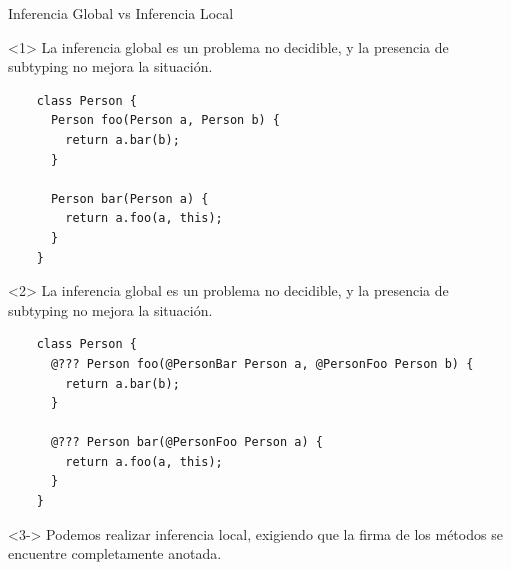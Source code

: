 \documentclass[aspectratio=169,10pt]{beamer}
\begin{document}
\begin{frame}[fragile]{Inferencia Global vs Inferencia Local}

  \begin{onlyenv}<1>
		\only<2-|handout:0>{\stepcounter{framenumber}}
    La inferencia global es un problema no decidible, y la presencia de subtyping no mejora la situación.
    \begin{lstlisting}
    class Person {
      Person foo(Person a, Person b) {
        return a.bar(b);
      }

      Person bar(Person a) {
        return a.foo(a, this);
      }
    }
    \end{lstlisting}
  \end{onlyenv}
  \begin{onlyenv}<2>
    La inferencia global es un problema no decidible, y la presencia de subtyping no mejora la situación.
    \begin{lstlisting}
    class Person {
      @??? Person foo(@PersonBar Person a, @PersonFoo Person b) {
        return a.bar(b);
      }

      @??? Person bar(@PersonFoo Person a) {
        return a.foo(a, this);
      }
    }
    \end{lstlisting}
  \end{onlyenv}

  \begin{onlyenv}<3->
    Podemos realizar inferencia local, exigiendo que la firma de los métodos se encuentre completamente anotada.
  \end{onlyenv}

\end{frame}
\end{document}
